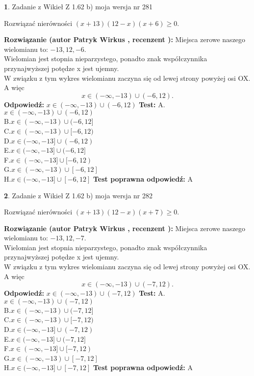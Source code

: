 \documentclass[12pt, a4paper]{article}
\theoremstyle{definition} %
\newtheorem{zad}{}
\newcommand{\zadStart}[1]{\begin{zad}#1\newline}
\newcommand{\zadStop}{\end{zad}}
\newcommand{\rozwStart}[2]{\noindent \textbf{Rozwiązanie (autor #1 , recenzent #2): }\newline}
\newcommand{\rozwStop}{\newline}
\newcommand{\odpStart}{\noindent \textbf{Odpowiedź:}\newline}
\newcommand{\odpStop}{\newline}
\newcommand{\testStart}{\noindent \textbf{Test:}\newline}
\newcommand{\testStop}{\newline}
\newcommand{\kluczStart}{\noindent \textbf{Test poprawna odpowiedź:}\newline}
\newcommand{\kluczStop}{\newline}
\begin{document}
\zadStart{Zadanie z Wikieł Z 1.62 b) moja wersja nr 281}

Rozwiązać nierówności $(x+13)(12-x)(x+6)\ge0$.
\zadStop
\rozwStart{Patryk Wirkus}{}
Miejsca zerowe naszego wielomianu to: $-13, 12, -6$.\\
Wielomian jest stopnia nieparzystego, ponadto znak współczynnika przy\linebreak najwyższej potędze x jest ujemny.\\ W związku z tym wykres wielomianu zaczyna się od lewej strony powyżej osi OX. A więc $$x \in (-\infty,-13) \cup (-6,12).$$
\rozwStop
\odpStart
$x \in (-\infty,-13) \cup (-6,12)$
\odpStop
\testStart
A.$x \in (-\infty,-13) \cup (-6,12)$\\
B.$x \in (-\infty,-13) \cup (-6,12]$\\
C.$x \in (-\infty,-13) \cup [-6,12)$\\
D.$x \in (-\infty,-13] \cup (-6,12)$\\
E.$x \in (-\infty,-13] \cup (-6,12]$\\
F.$x \in (-\infty,-13] \cup [-6,12)$\\
G.$x \in (-\infty,-13) \cup [-6,12]$\\
H.$x \in (-\infty,-13] \cup [-6,12]$
\testStop
\kluczStart
A
\kluczStop



\zadStart{Zadanie z Wikieł Z 1.62 b) moja wersja nr 282}

Rozwiązać nierówności $(x+13)(12-x)(x+7)\ge0$.
\zadStop
\rozwStart{Patryk Wirkus}{}
Miejsca zerowe naszego wielomianu to: $-13, 12, -7$.\\
Wielomian jest stopnia nieparzystego, ponadto znak współczynnika przy\linebreak najwyższej potędze x jest ujemny.\\ W związku z tym wykres wielomianu zaczyna się od lewej strony powyżej osi OX. A więc $$x \in (-\infty,-13) \cup (-7,12).$$
\rozwStop
\odpStart
$x \in (-\infty,-13) \cup (-7,12)$
\odpStop
\testStart
A.$x \in (-\infty,-13) \cup (-7,12)$\\
B.$x \in (-\infty,-13) \cup (-7,12]$\\
C.$x \in (-\infty,-13) \cup [-7,12)$\\
D.$x \in (-\infty,-13] \cup (-7,12)$\\
E.$x \in (-\infty,-13] \cup (-7,12]$\\
F.$x \in (-\infty,-13] \cup [-7,12)$\\
G.$x \in (-\infty,-13) \cup [-7,12]$\\
H.$x \in (-\infty,-13] \cup [-7,12]$
\testStop
\kluczStart
A
\kluczStop
\end{document}
